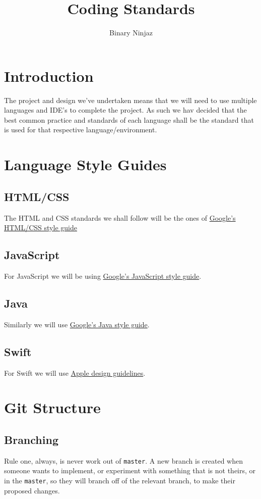 \documentclass[12pt]{article}
\title{Coding Standards}
\author{Binary Ninjaz}
\date{}
\begin{document}
  \maketitle
  \newpage
  
  \tableofcontents
  \newpage
  
  \section{Introduction}
  The project and design we've undertaken means that we will need to use multiple languages and IDE's to complete the project. As such we hav decided that the best common practice and standards of each language shall be the standard that is used for that respective language/environment.
  
  \section{Language Style Guides}
  \subsection{HTML/CSS}
  The HTML and CSS standards we shall follow will be the ones of \href{https://google.github.io/styleguide/htmlcssguide.html}{Google's HTML/CSS style guide}
  
  \subsection{JavaScript}
  For JavaScript we will be using \href{https://google.github.io/styleguide/jsguide.html}{Google's JavaScript style guide}.
  
  \subsection{Java}
  Similarly we will use \href{https://google.github.io/styleguide/javaguide.html}{Google's Java style guide}.
  \subsection{Swift}
  For Swift we will use \href{https://swift.org/documentation/api-design-guidelines/}{Apple design guidelines}.
  
  \section{Git Structure}
  \subsection{Branching}
  Rule one, always, is never work out of \texttt{master}. A new branch is created when someone wants to implement, or experiment with something that is not theirs, or in the \texttt{master}, so they will branch off of the relevant branch, to make their proposed changes.
\end{document}
